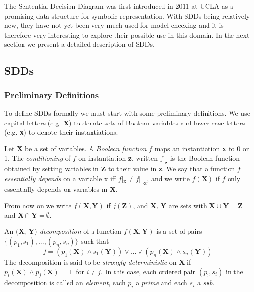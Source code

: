 \documentclass{article}
\newenvironment{definition}[1][Definition]{\begin{trivlist}
\item[\hskip \labelsep {\bfseries #1}]}{\end{trivlist}}
\begin{document}
The Sentential Decision Diagram was first introduced in 2011 at UCLA \cite{sdd_1} as a promising data structure for symbolic representation. With SDDs being relatively new, they have not yet been very much used for model checking and it is therefore very interesting to explore their possible use in this domain.
 In the next section we present a detailed description of SDDs. 


\subsection{SDDs}



\subsubsection{Preliminary Definitions}

To define SDDs formally we must start with some preliminary definitions. We use capital letters (e.g. \textbf{X}) to denote sets of Boolean variables and lower case letters (e.g. \textbf{x}) to denote their instantiations. 
\begin{definition} 
Let \textbf{X} be a set of variables. A \textit{Boolean function} $f$ maps an instantiation \textbf{x} to 0 or 1.
The \textit{conditioning} of $f$ on instantiation \textbf{z}, written $f|_{\textbf{z}}$ is the Boolean function obtained by setting variables in \textbf{Z} to their value in \textbf{z}. 
We say that a function $f$ \textit{essentially depends} on a variable x iff $f|_{\mbox{x}} \neq f|_{\lnot\mbox{x}}$, and we write $f(\textbf{X})$ if $f$ only essentially depends on variables in \textbf{X}.
\end{definition}

From now on we write $f(\textbf{X}, \textbf{Y})$ if $f(\textbf{Z})$, and \textbf{X}, \textbf{Y} are sets with $\textbf{X} \cup \textbf{Y} = \textbf{Z}$ and  
$\textbf{X} \cap \textbf{Y} = \emptyset$.
\begin{definition}
An (\textbf{X}, \textbf{Y})\textit{-decomposition} of a function $f(\textbf{X}, \textbf{Y})$ is a set of pairs $\{(p_1, s_1),...,(p_n, s_n)\}$ such that $$ f = (p_1(\textbf{X}) \land s_1(\textbf{Y})) \lor ... \lor (p_n(\textbf{X}) \land s_n(\textbf{Y}))$$
The decomposition is said to be \textit{strongly deterministic} on \textbf{X} if $p_i(\textbf{X}) \land p_j(\textbf{X}) = \bot$ for $i \neq j$. In this case, each ordered pair $(p_i, s_i)$ in the decomposition is called an \textit{element}, each $p_i$ a \textit{prime} and each $s_i$ a \textit{sub}.
\end{definition}
\end{document}
